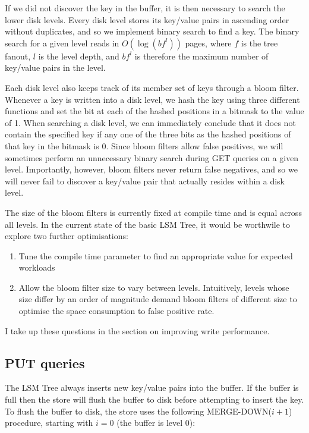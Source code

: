 \documentclass[format=acmtog, review=false]{acmart}
\begin{document}
If we did not discover the key in the buffer, it is then necessary to search the lower disk levels. Every disk level stores its key/value pairs in ascending order without duplicates, and so we implement binary search to find a key. The binary search for a given level reads in $O(\log(bf^l))$ pages, where $f$ is the tree fanout, $l$ is the level depth, and $bf^l$ is therefore the maximum number of key/value pairs in the level.

Each disk level also keeps track of its member set of keys through a bloom filter. Whenever a key is written into a disk level, we hash the key using three different functions and set the bit at each of the hashed positions in a bitmask to the value of 1. When searching a disk level, we can immediately conclude that it does not contain the specified key if any one of the three bits as the hashed positions of that key in the bitmask is 0. Since bloom filters allow false positives, we will sometimes perform an unnecessary binary search during GET queries on a given level. Importantly, however, bloom filters never return false negatives, and so we will never fail to discover a key/value pair that actually resides within a disk level.

The size of the bloom filters is currently fixed at compile time and is equal across all levels. In the current state of the basic LSM Tree, it would be worthwile to explore two further optimisations:

\begin{enumerate}
  \item Tune the compile time parameter to find an appropriate value for expected workloads
  \item Allow the bloom filter size to vary between levels. Intuitively, levels whose size differ by an order of magnitude demand bloom filters of different size to optimise the space consumption to false positive rate.
\end{enumerate}

I take up these questions in the section on improving write performance.

\subsection{PUT queries}

The LSM Tree always inserts new key/value pairs into the buffer. If the buffer is full then the store will flush the buffer to disk before attempting to insert the key. To flush the buffer to disk, the store uses the following MERGE-DOWN($i+1$) procedure, starting with $i=0$ (the buffer is level 0):
\end{document}
